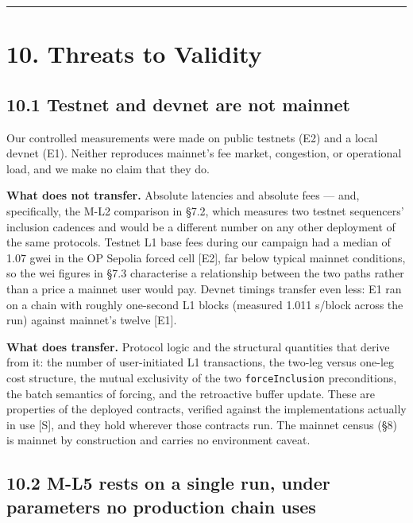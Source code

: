 \documentclass[conference]{IEEEtran}
\renewcommand{\_}{\textunderscore\allowbreak}
\begin{document}
\begin{center}\rule{0.5\linewidth}{0.5pt}\end{center}

\section{10. Threats to Validity}\label{threats-to-validity}

\subsection{10.1 Testnet and devnet are not
mainnet}\label{testnet-and-devnet-are-not-mainnet}

Our controlled measurements were made on public testnets (E2) and a
local devnet (E1). Neither reproduces mainnet's fee market, congestion,
or operational load, and we make no claim that they do.

\textbf{What does not transfer.} Absolute latencies and absolute fees
--- and, specifically, the M-L2 comparison in §7.2, which measures two
testnet sequencers' inclusion cadences and would be a different number
on any other deployment of the same protocols. Testnet L1 base fees
during our campaign had a median of 1.07 gwei in the OP Sepolia forced
cell {[}E2{]}, far below typical mainnet conditions, so the wei figures
in §7.3 characterise a relationship between the two paths rather than a
price a mainnet user would pay. Devnet timings transfer even less: E1
ran on a chain with roughly one-second L1 blocks (measured 1.011 s/block
across the run) against mainnet's twelve {[}E1{]}.

\textbf{What does transfer.} Protocol logic and the structural
quantities that derive from it: the number of user-initiated L1
transactions, the two-leg versus one-leg cost structure, the mutual
exclusivity of the two \texttt{forceInclusion} preconditions, the batch
semantics of forcing, and the retroactive buffer update. These are
properties of the deployed contracts, verified against the
implementations actually in use {[}S{]}, and they hold wherever those
contracts run. The mainnet census (§8) is mainnet by construction and
carries no environment caveat.

\subsection{10.2 M-L5 rests on a single run, under parameters no
production chain
uses}\label{m-l5-rests-on-a-single-run-under-parameters-no-production-chain-uses}
\end{document}
